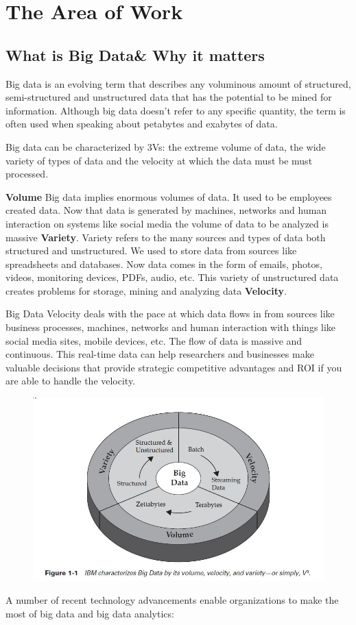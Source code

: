 \section{The Area of Work}
 
\subsection{What is Big Data\& Why it matters}
Big data is an evolving term that describes any voluminous amount of structured, semi-structured and unstructured data that has the potential to be mined for information. Although big data doesn't refer to any specific quantity, the term is often used when speaking about petabytes and exabytes of data.

Big data can be characterized by 3Vs: the extreme volume of data, the wide variety of types of data and the velocity at which the data must be must processed.

\textbf{Volume} Big data implies enormous volumes of data. It used to be employees created data. Now that data is generated by machines, networks and human interaction on systems like social media the volume of data to be analyzed is massive \textbf{Variety}. Variety refers to the many sources and types of data both structured and unstructured. We used to store data from sources like spreadsheets and databases. Now data comes in the form of emails, photos, videos, monitoring devices, PDFs, audio, etc. This variety of unstructured data creates problems for storage, mining and analyzing data \textbf{Velocity}.    

Big Data Velocity deals with the pace at which data flows in from sources like business processes, machines, networks and human interaction with things like social media sites, mobile devices, etc. The flow of data is massive and continuous. This real-time data can help researchers and businesses make valuable decisions that provide strategic competitive advantages and ROI if you are able to handle the velocity.


\begin{figure}[htp]
\centering
\includegraphics[scale=0.3]{Figures/fig-4.jpg}
\caption{}
\label{}
\end{figure}
A number of recent technology advancements enable organizations to make the most of big data and big data analytics:
\vspace*{-2mm}


